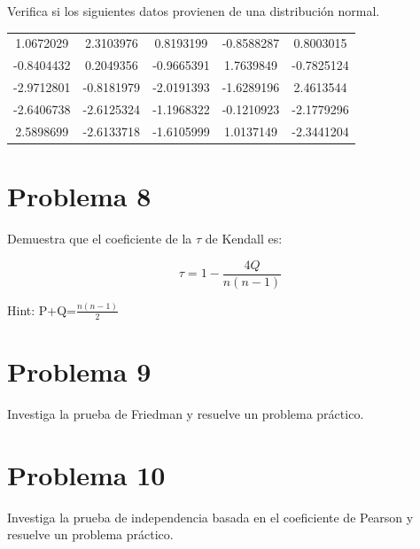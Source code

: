 \documentclass{article}
\begin{document}
Verifica si los siguientes datos provienen de una distribución normal.
\begin{center}
    \begin{tabular}{c c c c c}
        1.0672029  & 2.3103976  & 0.8193199  & -0.8588287 & 0.8003015  \\
        -0.8404432 & 0.2049356  & -0.9665391 & 1.7639849  & -0.7825124 \\
        -2.9712801 & -0.8181979 & -2.0191393 & -1.6289196 & 2.4613544  \\
        -2.6406738 & -2.6125324 & -1.1968322 & -0.1210923 & -2.1779296 \\
        2.5898699  & -2.6133718 & -1.6105999 & 1.0137149  & -2.3441204 \\
    \end{tabular}
\end{center}

\section{Problema 8}

Demuestra que el coeficiente de la $\tau$ de Kendall es:

$$\tau=1-\frac{4Q}{n(n-1)}$$

Hint: P+Q=$\frac{n(n-1)}{2}$

\section{Problema 9}

Investiga la prueba de Friedman y resuelve un problema práctico.

\section{Problema 10}

Investiga la prueba de independencia basada en el coeficiente de Pearson y resuelve un problema práctico.
\end{document}
